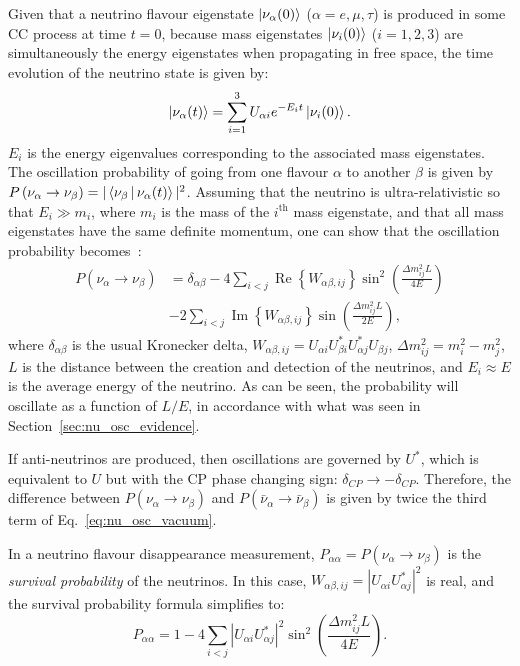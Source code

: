 Given that a neutrino flavour eigenstate $\Ket{\nu_{\alpha}(0)}$ ($\alpha=e,\mu,\tau$) is produced in some CC process at time $t = 0$, because mass eigenstates $\Ket{\nu_{i}(0)}$ ($i=1,2,3$) are simultaneously the energy eigenstates when propagating in free space, the time evolution of the neutrino state is given by:
\begin{equation}
    \Ket{\nu_{\alpha}(t)} = \sum_{i=1}^{3}U_{\alpha i}e^{-E_{i}t}\Ket{\nu_{i}(0)}.
\end{equation}
$E_{i}$ is the energy eigenvalues corresponding to the associated mass eigenstates. The oscillation probability of going from one flavour $\alpha$ to another $\beta$ is given by $P\left(\nu_{\alpha}\to\nu_{\beta}\right) = |\Braket{\nu_{\beta} | \nu_{\alpha}(t)}|^{2}$. Assuming that the neutrino is ultra-relativistic so that $E_{i}\gg m_{i}$, where $m_{i}$ is the mass of the $i^{\mathrm{th}}$ mass eigenstate, and that all mass eigenstates have the same definite momentum, one can show that the oscillation probability becomes~\cite{deppischChapterNeutrinoOscillations2019}: %
\begin{align}\label{eq:nu_osc_vacuum}
    P\left(\nu_{\alpha}\to\nu_{\beta}\right) &=
        \delta_{\alpha\beta} 
        - 4\sum_{i<j}\operatorname{Re}\left\{W_{\alpha\beta,ij}\right\}\sin^{2}\left(\frac{\Delta m^{2}_{ij}L}{4E}\right)\nonumber\\
        &- 2\sum_{i<j}\operatorname{Im}\left\{W_{\alpha\beta,ij}\right\}\sin\left(\frac{\Delta m^{2}_{ij}L}{2E}\right),
\end{align}
where $\delta_{\alpha\beta}$ is the usual Kronecker delta, $W_{\alpha\beta,ij}=U_{\alpha i}U_{\beta i}^{*}U_{\alpha j}^{*}U_{\beta j}$, $\Delta m^{2}_{ij}=m^{2}_{i} - m^{2}_{j}$, $L$ is the distance between the creation and detection of the neutrinos, and $E_{i}\approx E$ is the average energy of the neutrino. As can be seen, the probability will oscillate as a function of $L/E$, in accordance with what was seen in Section~\ref{sec:nu_osc_evidence}.

If anti-neutrinos are produced, then oscillations are governed by $U^{*}$, which is equivalent to $U$ but with the CP phase changing sign: $\delta_{CP}\to -\delta_{CP}$. Therefore, the difference between $P\left(\nu_{\alpha}\to\nu_{\beta}\right)$ and $P\left(\bar{\nu}_{\alpha}\to\bar{\nu}_{\beta}\right)$ is given by twice the third term of Eq.~\ref{eq:nu_osc_vacuum}.

In a neutrino flavour disappearance measurement, $P_{\alpha\alpha} = P\left(\nu_{\alpha}\to\nu_{\beta}\right)$ is the \textit{survival probability} of the neutrinos. In this case, $W_{\alpha\beta,ij} = |U_{\alpha i}U_{\alpha j}^{*}|^{2}$ is real, and the survival probability formula simplifies to:
\begin{equation}
    P_{\alpha\alpha} = 1 
    - 4\sum_{i<j}|U_{\alpha i}U_{\alpha j}^{*}|^{2}\sin^{2}\left(\frac{\Delta m^{2}_{ij}L}{4E}\right).
\end{equation}


